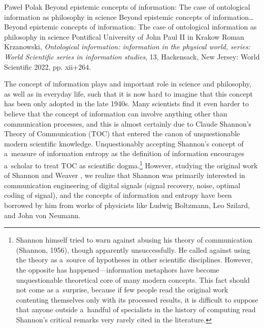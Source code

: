 \begin{newrevengenv}{Paweł Polak}
	{Beyond epistemic concepts of information: The case of ontological information as philosophy in science}
	{Beyond epistemic concepts of information\ldots}
	{Beyond epistemic concepts of information: The case of ontological information as philosophy in science}
	{Pontifical University of John Paul II in Krakow}
	{Roman Krzanowski, \textit{Ontological information: information in the physical world, series: World Scientific series in information studies}, 13, Hackensack, New Jersey: World Scientific 2022, pp. xii+264.}
	
	
	
%
%
%

The concept of information plays and important role in science and philosophy, as well as in everyday life, such that it is now hard to imagine that this concept has been only adopted in the late 1940s. Many scientists find it even harder to believe that the concept of information can involve anything other than communication processes, and this is almost certainly due to Claude Shannon's Theory of Communication (TOC)
\parencite*[][]{shannon_mathematical_1949} %
 that entered the canon of unquestionable modern scientific knowledge. Unquestionably accepting Shannon's concept of a~measure of information entropy as the definition of information encourages a~scholar to treat TOC as scientific dogma.\footnote{ Shannon himself tried to warn against abusing his theory of communication (Shannon, 1956), though apparently unsuccessfully. He called against using the theory as a~source of hypotheses in other scientific disciplines. However, the opposite has happened—information metaphors have become unquestionable theoretical core of many modern concepts. This fact should not come as a~surprise, because if few people read the original work contenting themselves only with its processed results, it is difficult to suppose that anyone outside a~handful of specialists in the history of computing read Shannon's critical remarks very rarely cited in the literature.} However, studying the original work of Shannon and Weaver 
\parencite*[][p.3]{shannon_mathematical_1964}, %
 we realize that Shannon was primarily interested in communication engineering of digital signals (signal recovery, noise, optimal coding of signal), and the concepts of information and entropy have been borrowed by him from works of physicists like Ludwig Boltzmann, Leo Szilard, and John von Neumann.


\end{newrevengenv}
